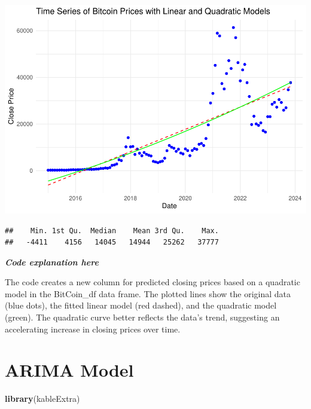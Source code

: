 \documentclass[
]{book}
\newenvironment{Shaded}{\begin{snugshade}}{\end{snugshade}}
\newcommand{\FunctionTok}[1]{\textcolor[rgb]{0.13,0.29,0.53}{\textbf{#1}}}
\newcommand{\NormalTok}[1]{#1}
\newcommand{\SpecialCharTok}[1]{\textcolor[rgb]{0.81,0.36,0.00}{\textbf{#1}}}
\begin{document}
\includegraphics{bookdown-demo_files/figure-latex/unnamed-chunk-32-1.pdf}

\begin{Shaded}
\end{Shaded}

\begin{verbatim}
##    Min. 1st Qu.  Median    Mean 3rd Qu.    Max. 
##   -4411    4156   14045   14944   25262   37777
\end{verbatim}

\emph{\textbf{Code explanation here}}

The code creates a new column for predicted closing prices based on a quadratic model in the BitCoin\_df data frame. The plotted lines show the original data (blue dots), the fitted linear model (red dashed), and the quadratic model (green). The quadratic curve better reflects the data's trend, suggesting an accelerating increase in closing prices over time.

\chapter{ARIMA Model}\label{arima-model}

\begin{Shaded}
\begin{Highlighting}[]
\FunctionTok{library}\NormalTok{(kableExtra)}
\end{Highlighting}
\end{Shaded}
\end{document}
